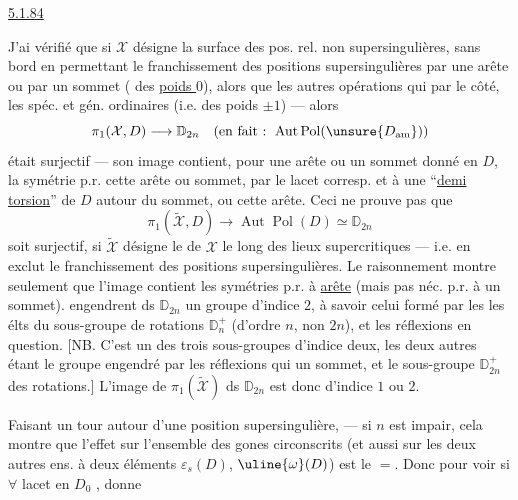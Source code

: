 \uline{5.1.84}

J'ai vérifié que si $\mathcal X$ désigne la
surface des pos. rel. non supersingulières,
sans bord en permettant le franchissement
des positions supersingulières
par une arête ou par un sommet
( des \uline{poids $0$}), alors que les
autres opérations qui 
par le côté,  les spéc. et gén.
ordinaires (i.e. des poids $\pm1$) --- alors
\[
\pi_1(\mathcal X,D)\longrightarrow\mathbb D_{2n}
\quad\text{(en fait : }\operatorname{Aut}\operatorname{Pol}(\unsure{D_{\mathrm{am}}})\text{)}
\]
était surjectif --- son image contient,
pour une arête ou un  sommet
donné en $D$, la symétrie p.r.
cette arête ou sommet, par le lacet
corresp. et à une ``\uline{demi torsion}'' de $D$
autour du  sommet, ou cette
arête. Ceci ne prouve pas que
\[
\pi_1(\widetilde{\mathcal X},D)\longrightarrow
\operatorname{Aut}\operatorname{Pol}(D)\simeq\mathbb D_{2n}
\]
soit surjectif, si $\widetilde{\mathcal X}$ désigne le 
de $\mathcal X$ le long des lieux supercritiques
--- i.e. en exclut le franchissement des
positions supersingulières. Le raisonnement
montre seulement que l'image contient
les symétries p.r. à  \uline{arête} (mais pas
néc. p.r. à un sommet). 
engendrent ds $\mathbb D_{2n}$ un  groupe
d'indice $2$, à savoir celui formé par les
 les élts du sous-groupe
de rotations $\mathbb D_n^+$ (d'ordre \uline{$n$}, non $2n$),
et les réflexions en question. [NB. C'est
un des trois sous-groupes d'indice deux,
les deux autres étant le groupe engendré
par les  réflexions qui  
un sommet, et le sous-groupe $\mathbb D_{2n}^+$
des rotations.] L'image de $\pi_1(\widetilde{\mathcal X})$ ds $\mathbb D_{2n}$
est donc d'indice $1$ ou $2$.

Faisant un   tour 
autour d'une position supersingulière,
   --- si $n$ est 
impair, cela montre que l'effet sur
l'ensemble   des gones
circonscrits (et aussi sur les deux autres
ens. à deux éléments $\varepsilon_s(D)$, $\uline{\omega}(D)$)
est le $=$.  Donc pour voir si $\forall$
lacet en $D_0$ , donne 

